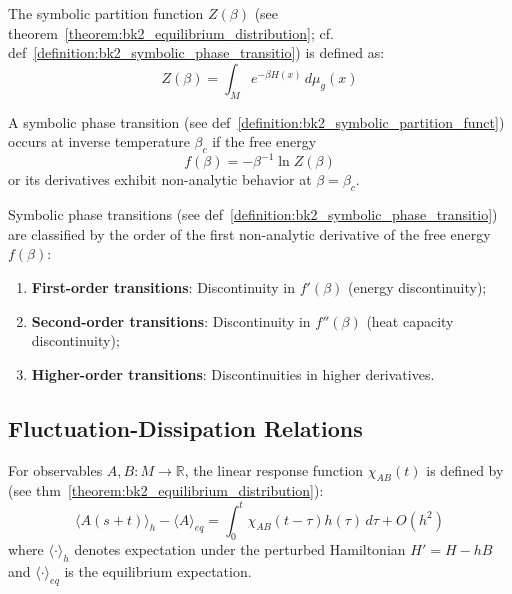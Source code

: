 \begin{definition} 
\label{definition:bk2_symbolic_partition_funct} 
The symbolic partition function $Z(\beta)$ (see theorem~\ref{theorem:bk2_equilibrium_distribution}; cf. def~\ref{definition:bk2_symbolic_phase_transitio}) is defined as:
\[
Z(\beta) = \int_M e^{-\beta H(x)} \, d\mu_g(x)
\]
\end{definition}

\begin{definition} 
\label{definition:bk2_symbolic_phase_transitio} 
A symbolic phase transition (see def~\ref{definition:bk2_symbolic_partition_funct}) occurs at inverse temperature $\beta_c$ if the free energy
\[
f(\beta) = -\beta^{-1} \ln Z(\beta)
\]
or its derivatives exhibit non-analytic behavior at $\beta = \beta_c$.
\end{definition}

\begin{theorem} 
\label{thm:bk2_classification_symb_phase_transitions} 
Symbolic phase transitions (see def~\ref{definition:bk2_symbolic_phase_transitio}) are classified by the order of the first non-analytic derivative of the free energy $f(\beta)$:
\begin{enumerate}
    \item \textbf{First-order transitions}: Discontinuity in $f'(\beta)$ (energy discontinuity);
    \item \textbf{Second-order transitions}: Discontinuity in $f''(\beta)$ (heat capacity discontinuity);
    \item \textbf{Higher-order transitions}: Discontinuities in higher derivatives.
\end{enumerate}
\end{theorem}

\subsection{Fluctuation-Dissipation Relations}
\label{subsec:bk2_symbolic_fluctuation_dissipation_relations}

\begin{definition} 
\label{definition:bk2_symbolic_response_functi} 
For observables $A, B: M \to \mathbb{R}$, the linear response function $\chi_{AB}(t)$ is defined by (see thm~\ref{theorem:bk2_equilibrium_distribution}):
\[
\langle A(s+t) \rangle_h - \langle A \rangle_{eq} = \int_0^t \chi_{AB}(t-\tau) h(\tau) \, d\tau + O(h^2)
\]
where $\langle \cdot \rangle_h$ denotes expectation under the perturbed Hamiltonian $H' = H - hB$ and $\langle \cdot \rangle_{eq}$ is the equilibrium expectation.
\end{definition}

